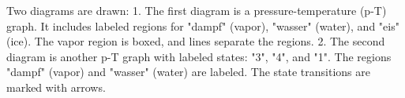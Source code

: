 Two diagrams are drawn:  
1. The first diagram is a pressure-temperature (p-T) graph. It includes labeled regions for "dampf" (vapor), "wasser" (water), and "eis" (ice). The vapor region is boxed, and lines separate the regions.  
2. The second diagram is another p-T graph with labeled states: "3", "4", and "1". The regions "dampf" (vapor) and "wasser" (water) are labeled. The state transitions are marked with arrows.